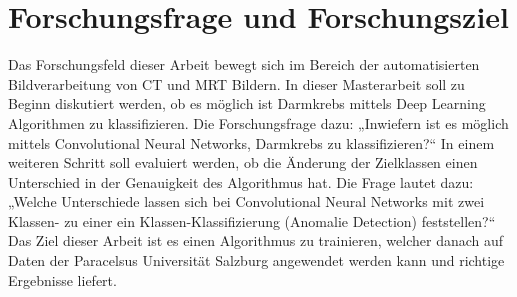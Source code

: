 \section{Forschungsfrage und Forschungsziel}
Das Forschungsfeld dieser Arbeit bewegt sich im Bereich der automatisierten Bildverarbeitung von CT und MRT Bildern. In dieser Masterarbeit soll zu Beginn diskutiert werden, ob es möglich ist Darmkrebs mittels Deep Learning Algorithmen zu klassifizieren. Die Forschungsfrage dazu: „Inwiefern ist es möglich mittels Convolutional Neural Networks, Darmkrebs zu klassifizieren?“ In einem weiteren Schritt soll evaluiert werden, ob die Änderung der Zielklassen einen Unterschied in der Genauigkeit des Algorithmus hat. Die Frage lautet dazu: „Welche Unterschiede lassen sich bei Convolutional Neural Networks mit zwei Klassen- zu einer ein Klassen-Klassifizierung (Anomalie Detection) feststellen?“ Das Ziel dieser Arbeit ist es einen Algorithmus zu trainieren, welcher danach auf Daten der Paracelsus Universität Salzburg angewendet werden kann und richtige Ergebnisse liefert. 
